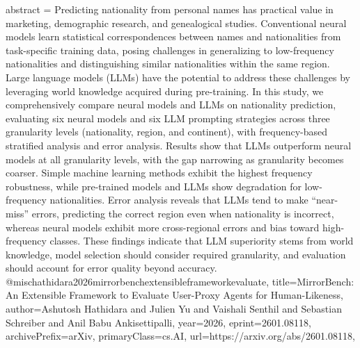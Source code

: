 {      abstract = {Predicting nationality from personal names has practical value in marketing, demographic research, and genealogical studies. Conventional neural models learn statistical correspondences between names and nationalities from task-specific training data, posing challenges in generalizing to low-frequency nationalities and distinguishing similar nationalities within the same region. Large language models (LLMs) have the potential to address these challenges by leveraging world knowledge acquired during pre-training. In this study, we comprehensively compare neural models and LLMs on nationality prediction, evaluating six neural models and six LLM prompting strategies across three granularity levels (nationality, region, and continent), with frequency-based stratified analysis and error analysis. Results show that LLMs outperform neural models at all granularity levels, with the gap narrowing as granularity becomes coarser. Simple machine learning methods exhibit the highest frequency robustness, while pre-trained models and LLMs show degradation for low-frequency nationalities. Error analysis reveals that LLMs tend to make ``near-miss'' errors, predicting the correct region even when nationality is incorrect, whereas neural models exhibit more cross-regional errors and bias toward high-frequency classes. These findings indicate that LLM superiority stems from world knowledge, model selection should consider required granularity, and evaluation should account for error quality beyond accuracy.}
}@misc{hathidara2026mirrorbenchextensibleframeworkevaluate,
      title={MirrorBench: An Extensible Framework to Evaluate User-Proxy Agents for Human-Likeness}, 
      author={Ashutosh Hathidara and Julien Yu and Vaishali Senthil and Sebastian Schreiber and Anil Babu Ankisettipalli},
      year={2026},
      eprint={2601.08118},
      archivePrefix={arXiv},
      primaryClass={cs.AI},
      url={https://arxiv.org/abs/2601.08118},
}
